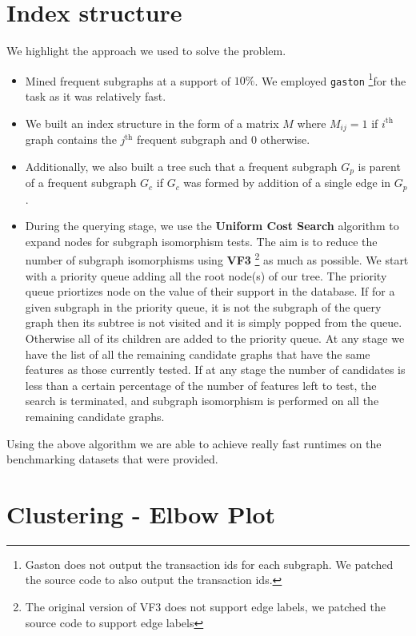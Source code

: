 \documentclass[hidelinks,12pt]{article}
\begin{document}
\section{Index structure}

We highlight the approach we used to solve the problem.
\begin{itemize}
  \item Mined frequent subgraphs at a support of \(10\%\). We employed \verb|gaston| \footnote{ Gaston does not output the transaction ids for each subgraph. We patched the source code to also output the transaction ids.}for the task as it was relatively fast.
  \item We built an index structure in the form of a matrix \(M\) where \(M_{ij} = 1\) if \(i^{\text{th}}\) graph contains the \(j^{\text{th}}\) frequent subgraph and \(0\) otherwise.
  \item Additionally, we also built a tree such that a frequent subgraph \(G_p\) is  parent of a frequent subgraph \(G_c\) if \(G_c\) was formed by addition of a single edge in \(G_p\).
  \item During the querying stage, we use the \textbf{Uniform Cost Search} algorithm to expand nodes for subgraph isomorphism tests. The aim is to reduce the number of subgraph isomorphisms using \textbf{VF3} \footnote{The original version of VF3 does not support edge labels, we patched the source code to support edge labels} as much as possible. We start with a priority queue adding all the root node(s) of our tree. The priority queue priortizes node on the value of their support in the database. If for a given subgraph in the priority queue, it is not the subgraph of the query graph then its subtree is not visited and it is simply popped from the queue. Otherwise all of its children are added to the priority queue. At any stage we have the list of all the remaining candidate graphs that have the same features as those currently tested. If at any stage the number of candidates is less than a certain percentage of the number of features left to test, the search is terminated, and subgraph isomorphism is performed on all the remaining candidate graphs.
\end{itemize}
Using the above algorithm we are able to achieve really fast runtimes on the benchmarking datasets that were provided.
\section{Clustering - Elbow Plot}
\end{document}
